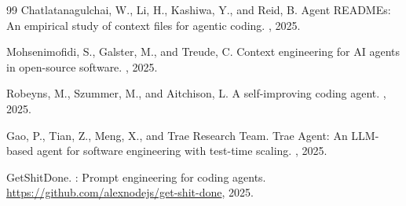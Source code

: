 \documentclass{article}
\begin{document}
{\begin{thebibliography}{99}
Chatlatanagulchai, W., Li, H., Kashiwa, Y., and Reid, B.
\newblock Agent {README}s: An empirical study of context files for
  agentic coding.
, 2025.

Mohsenimofidi, S., Galster, M., and Treude, C.
\newblock Context engineering for {AI} agents in open-source software.
, 2025.

Robeyns, M., Szummer, M., and Aitchison, L.
\newblock A self-improving coding agent.
, 2025.

Gao, P., Tian, Z., Meng, X., and {Trae Research Team}.
\newblock Trae Agent: An {LLM}-based agent for software engineering
  with test-time scaling.
, 2025.

{GetShitDone}.
: Prompt engineering for coding agents.
\newblock \url{https://github.com/alexnodejs/get-shit-done}, 2025.

\end{thebibliography}
}

\newpage

\end{document}
